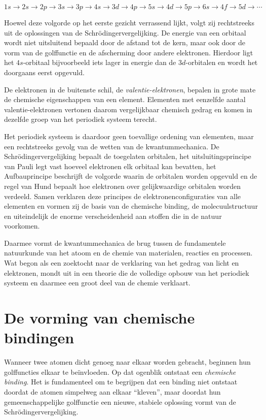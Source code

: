 \begin{equation*}
1s
\rightarrow
2s
\rightarrow
2p
\rightarrow
3s
\rightarrow
3p
\rightarrow
4s
\rightarrow
3d
\rightarrow
4p
\rightarrow
5s
\rightarrow
4d
\rightarrow
5p
\rightarrow
6s
\rightarrow
4f
\rightarrow
5d
\rightarrow
\cdots
\end{equation*}

Hoewel deze volgorde op het eerste gezicht verrassend lijkt, volgt zij rechtstreeks uit de oplossingen van de Schr\"odingervergelijking. De energie van een orbitaal wordt niet uitsluitend bepaald door de afstand tot de kern, maar ook door de vorm van de golffunctie en de afscherming door andere elektronen. Hierdoor ligt het $4s$-orbitaal bijvoorbeeld iets lager in energie dan de $3d$-orbitalen en wordt het doorgaans eerst opgevuld.

De elektronen in de buitenste schil, de \emph{valentie-elektronen}, bepalen in grote mate de chemische eigenschappen van een element. Elementen met eenzelfde aantal valentie-elektronen vertonen daarom vergelijkbaar chemisch gedrag en komen in dezelfde groep van het periodiek systeem terecht.

Het periodiek systeem is daardoor geen toevallige ordening van elementen, maar een rechtstreeks gevolg van de wetten van de kwantummechanica. De Schr\"odingervergelijking bepaalt de toegelaten orbitalen, het uitsluitingsprincipe van Pauli legt vast hoeveel elektronen elk orbitaal kan bevatten, het Aufbauprincipe beschrijft de volgorde waarin de orbitalen worden opgevuld en de regel van Hund bepaalt hoe elektronen over gelijkwaardige orbitalen worden verdeeld. Samen verklaren deze principes de elektronenconfiguraties van alle elementen en vormen zij de basis van de chemische binding, de molecuulstructuur en uiteindelijk de enorme verscheidenheid aan stoffen die in de natuur voorkomen.

Daarmee vormt de kwantummechanica de brug tussen de fundamentele natuurkunde van het atoom en de chemie van materialen, reacties en processen. Wat begon als een zoektocht naar de verklaring van het gedrag van licht en elektronen, mondt uit in een theorie die de volledige opbouw van het periodiek systeem en daarmee een groot deel van de chemie verklaart.

\section{De vorming van chemische bindingen}

Wanneer twee atomen dicht genoeg naar elkaar worden gebracht, beginnen hun golffuncties elkaar te be\"invloeden. Op dat ogenblik ontstaat een \emph{chemische binding}. Het is fundamenteel om te begrijpen dat een binding niet ontstaat doordat de atomen simpelweg aan elkaar ``kleven'', maar doordat hun gemeenschappelijke golffunctie een nieuwe, stabiele oplossing vormt van de Schr\"odingervergelijking.

